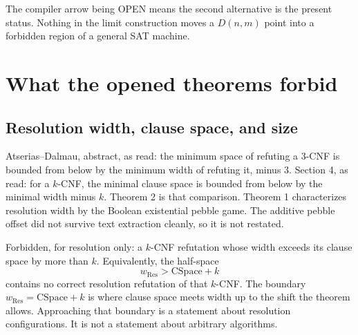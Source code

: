 \documentclass[11pt]{article}
\begin{document}
The compiler arrow being OPEN means the second alternative is the present status. Nothing in the limit construction moves a \(D(n,m)\) point into a forbidden region of a general SAT machine.

\section*{What the opened theorems forbid}
\subsection*{Resolution width, clause space, and size}
Atserias--Dalmau, abstract, as read: the minimum space of refuting a 3-CNF is bounded from below by the minimum width of refuting it, minus 3. Section 4, as read: for a \(k\)-CNF, the minimal clause space is bounded from below by the minimal width minus \(k\). Theorem 2 is that comparison. Theorem 1 characterizes resolution width by the Boolean existential pebble game. The additive pebble offset did not survive text extraction cleanly, so it is not restated.

Forbidden, for resolution only: a \(k\)-CNF refutation whose width exceeds its clause space by more than \(k\). Equivalently, the half-space
\[
w_{\mathrm{Res}} > \mathrm{CSpace} + k
\]
contains no correct resolution refutation of that \(k\)-CNF. The boundary \(w_{\mathrm{Res}} = \mathrm{CSpace}+k\) is where clause space meets width up to the shift the theorem allows. Approaching that boundary is a statement about resolution configurations. It is not a statement about arbitrary algorithms.
\end{document}
